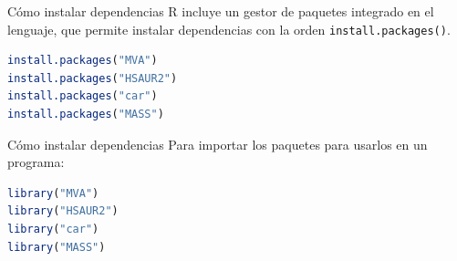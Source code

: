 \documentclass[xcolor=table]{beamer}
\begin{document}
\begin{frame}[fragile]{Cómo instalar dependencias}
R incluye un gestor de paquetes integrado en el lenguaje, que permite instalar dependencias con la orden \texttt{install.packages()}.
  
\begin{lstlisting}[language=R, basicstyle=\ttfamily]
install.packages("MVA")
install.packages("HSAUR2")
install.packages("car")
install.packages("MASS")
\end{lstlisting}

\end{frame}

\begin{frame}[fragile]{Cómo instalar dependencias}
Para importar los paquetes para usarlos en un programa:  
\begin{lstlisting}[language=R, basicstyle=\ttfamily]
library("MVA")
library("HSAUR2")
library("car")
library("MASS")
\end{lstlisting}

\end{frame}
\end{document}
